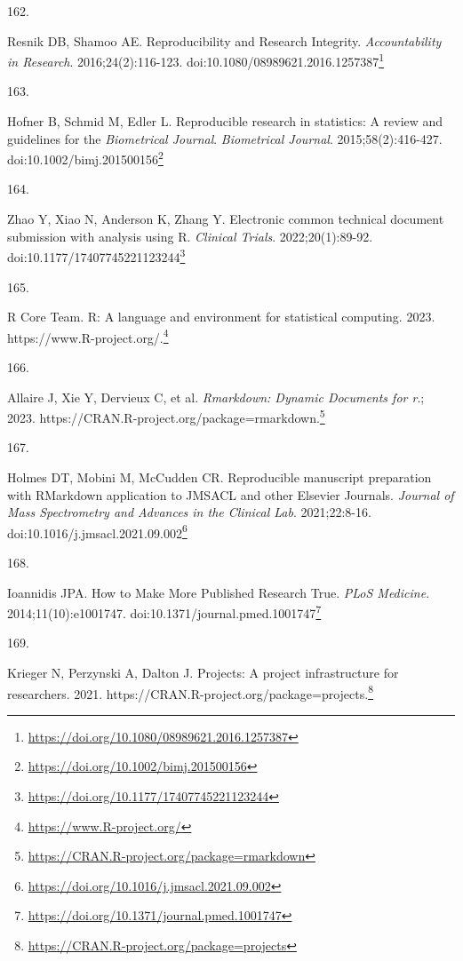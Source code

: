 \documentclass[
]{book}
\newlength{\cslhangindent}
\newlength{\csllabelwidth}
\newlength{\cslentryspacingunit} %
\newenvironment{CSLReferences}[2] %
 {%
  \setlength{\parindent}{0pt}
  \ifodd #1
  \let\oldpar\par
  \def\par{\hangindent=\cslhangindent\oldpar}
  \fi
  \setlength{\parskip}{#2\cslentryspacingunit}
 }%
 {}
\newcommand{\CSLLeftMargin}[1]{\parbox[t]{\csllabelwidth}{#1}}
\newcommand{\CSLRightInline}[1]{\parbox[t]{\linewidth - \csllabelwidth}{#1}\break}
\renewcommand{\href}[2]{#2\footnote{\url{#1}}}
\begin{document}
\begin{CSLReferences}{0}{0}
\leavevmode{}%
\CSLLeftMargin{162. }%
\CSLRightInline{Resnik DB, Shamoo AE. Reproducibility and Research Integrity. \emph{Accountability in Research}. 2016;24(2):116-123. doi:\href{https://doi.org/10.1080/08989621.2016.1257387}{10.1080/08989621.2016.1257387}}

\leavevmode{}%
\CSLLeftMargin{163. }%
\CSLRightInline{Hofner B, Schmid M, Edler L. Reproducible research in statistics: A review and guidelines for the {\emph{Biometrical Journal}}. \emph{Biometrical Journal}. 2015;58(2):416-427. doi:\href{https://doi.org/10.1002/bimj.201500156}{10.1002/bimj.201500156}}

\leavevmode{}%
\CSLLeftMargin{164. }%
\CSLRightInline{Zhao Y, Xiao N, Anderson K, Zhang Y. Electronic common technical document submission with analysis using R. \emph{Clinical Trials}. 2022;20(1):89-92. doi:\href{https://doi.org/10.1177/17407745221123244}{10.1177/17407745221123244}}

\leavevmode{}%
\CSLLeftMargin{165. }%
\CSLRightInline{R Core Team. R: A language and environment for statistical computing. 2023. \href{https://www.R-project.org/}{https://www.R-project.org/.}}

\leavevmode{}%
\CSLLeftMargin{166. }%
\CSLRightInline{Allaire J, Xie Y, Dervieux C, et al. \emph{Rmarkdown: Dynamic Documents for r}.; 2023. \href{https://CRAN.R-project.org/package=rmarkdown}{https://CRAN.R-project.org/package=rmarkdown.}}

\leavevmode{}%
\CSLLeftMargin{167. }%
\CSLRightInline{Holmes DT, Mobini M, McCudden CR. Reproducible manuscript preparation with RMarkdown application to JMSACL and other Elsevier Journals. \emph{Journal of Mass Spectrometry and Advances in the Clinical Lab}. 2021;22:8-16. doi:\href{https://doi.org/10.1016/j.jmsacl.2021.09.002}{10.1016/j.jmsacl.2021.09.002}}

\leavevmode{}%
\CSLLeftMargin{168. }%
\CSLRightInline{Ioannidis JPA. How to Make More Published Research True. \emph{PLoS Medicine}. 2014;11(10):e1001747. doi:\href{https://doi.org/10.1371/journal.pmed.1001747}{10.1371/journal.pmed.1001747}}

\leavevmode{}%
\CSLLeftMargin{169. }%
\CSLRightInline{Krieger N, Perzynski A, Dalton J. Projects: A project infrastructure for researchers. 2021. \href{https://CRAN.R-project.org/package=projects}{https://CRAN.R-project.org/package=projects.}}


\end{CSLReferences}
\end{document}
